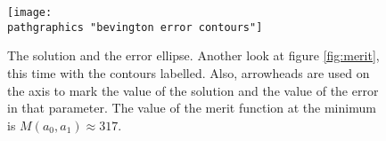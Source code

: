 \begin{figure}[t]
	\texttt{[image: \\pathgraphics "bevington error contours"]}
	\caption[The solution and the error ellipse]{The solution and the error ellipse. Another look at figure \eqref{fig:merit}, this time with the contours labelled. Also, arrowheads are used on the axis to mark the value of the solution and the value of the error in that parameter. The value of the merit function at the minimum is $M(a_{0}, a_{1}) \approx 317$.}
	\label{fig:ellipse}
\end{figure}

\endinput  %